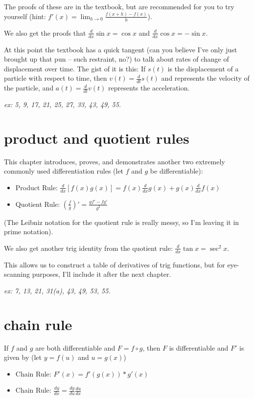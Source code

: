 \documentclass[10pt,a4paper]{report}
\begin{document}
The proofs of these are in the textbook, but are recommended for you to try yourself (hint: $f'(x) = \lim_{h \to 0} \frac{f(x + h) - f(x)}{h}$).

We also get the proofs that $\frac{d}{dx} \sin x = \cos x$ and $\frac{d}{dx} \cos x = - \sin x$.

At this point the textbook has a quick tangent (can you believe I've only just brought up that pun -- such restraint, no?) to talk about rates of change of displacement over time. The gist of it is this:
If $s(t)$ is the displacement of a particle with respect to time, then $v(t) = \frac{d}{dt} s(t)$ and represents the velocity of the particle, and $a(t) = \frac{d}{dt} v(t)$ represents the acceleration.


\emph{ex: 5, 9, 17, 21, 25, 27, 33, 43, 49, 55.}


\section{product and quotient rules}

This chapter introduces, proves, and demonstrates another two extremely commonly used differentiation rules (let $f$ and $g$ be differentiable):

\begin{itemize}
	\item Product Rule: $\frac{d}{dx}[f(x)g(x)] = f(x) \frac{d}{dx} g(x) + g(x) \frac{d}{dx} f(x)$
	\item Quotient Rule: $(\frac{f}{g})' = \frac{gf' - fg'}{g^2}$

\end{itemize}

(The Leibniz notation for the quotient rule is really messy, so I'm leaving it in prime notation).

We also get another trig identity from the quotient rule: $\frac{d}{dx} \tan x = \sec^2 x$.

This allows us to construct a table of derivatives of trig functions, but for eye-scanning purposes, I'll include it after the next chapter.

\emph{ex: 7, 13, 21, 31(a), 43, 49, 53, 55.}

\section{chain rule}

If $f$ and $g$ are both differentiable and $F = f \circ g$, then $F$ is differentiable and $F'$ is given by (let $y = f(u)$ and $u = g(x)$)
\begin{itemize}
	\item Chain Rule: $F'(x) = f'(g(x)) * g'(x)$
	\item Chain Rule: $\frac{dy}{dx} = \frac{dy}{du} \frac{du}{dx}$
\end{itemize}
\end{document}
